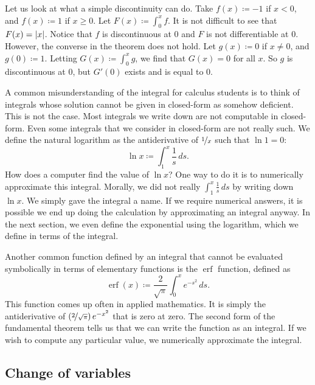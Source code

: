 Let us look at what a simple discontinuity can do.  Take $f(x) \coloneqq -1$ if $x
< 0$, and $f(x) \coloneqq 1$ if $x \geq 0$.  Let $F(x) \coloneqq \int_0^x f$.  It is not
difficult to see that $F(x) = \left\lvert {x} \right\rvert$.  Notice that $f$ is discontinuous at
$0$ and $F$ is not differentiable at $0$.  However, the converse in the
theorem does not
hold.
Let $g(x) \coloneqq 0$ if $x \not= 0$, and $g(0) \coloneqq 1$.
Letting $G(x) \coloneqq \int_0^x g$,
we find that $G(x) = 0$ for all $x$.  So $g$ is discontinuous
at $0$, but $G'(0)$ exists and is equal to 0.

A common misunderstanding of the integral for calculus students is to
think of integrals whose solution cannot be given in closed-form as somehow
deficient.  This is not the case.  Most integrals we write down are not
computable in closed-form.  Even some integrals that we consider
in closed-form are not really such.  We define
the natural logarithm as the antiderivative of $\nicefrac{1}{x}$
such that $\ln 1 = 0$:
\begin{equation*}
\ln x \coloneqq \int_1^x \frac{1}{s}\,ds .
\end{equation*}
How does a computer find the value of $\ln x$?
One way to do it is to numerically approximate this integral.
Morally,
we did not really  $\int_1^x \frac{1}{s}\,ds$ by
writing down $\ln x$.  We simply gave the integral a name.
If we require numerical answers,
it is possible we end up doing
the calculation by approximating an integral anyway.
In the next section, we even define the exponential using
the logarithm, which we define in terms of the integral.

Another common function defined by an integral that cannot
be evaluated symbolically in terms of elementary functions
is the $\operatorname{erf}$ function, defined as
\begin{equation*}
\operatorname{erf}(x) \coloneqq \frac{2}{\sqrt{\pi}} \int_0^x e^{-s^2} \,ds .
\end{equation*}
This function comes up often in applied mathematics.  It is simply 
the antiderivative of $\left(\nicefrac{2}{\sqrt{\pi}}\right) e^{-x^2}$
that is zero at zero.
The second form of the fundamental theorem tells us that we can write the function
as an integral.  If we wish to compute any particular value, we 
numerically approximate the integral.

\subsection{Change of variables}


